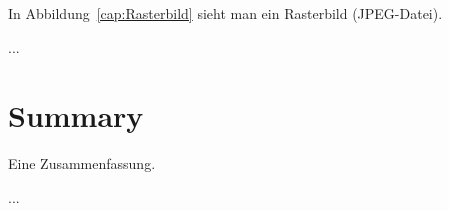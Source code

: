 In Abbildung~\ref{cap:Rasterbild} sieht man ein Rasterbild (JPEG-Datei).

...



\section{Summary}

Eine Zusammenfassung.

...
